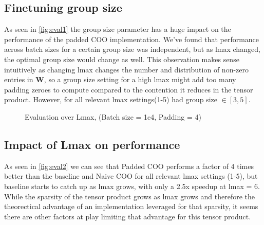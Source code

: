 \subsection{Finetuning group size}
\label{sec:eval:group}
As seen in \autoref{fig:eval1} the group size parameter has a huge impact on the performance of the padded COO implementation. We've found
that performance across batch sizes for a certain group size was independent, but as lmax changed, the optimal group size would change as well.
This observation makes sense intuitively as changing lmax changes the number and distribution of non-zero entries in \textbf{W}, so a group size setting 
for a high lmax might add too many padding zeroes to compute compared to the contention it reduces in the tensor product. However, for all relevant lmax settings(1-5) had group size $\in [3, 5]$.
\begin{figure}
    \centering
{}
\label{fig:eval2}
\caption{Evaluation over Lmax, (Batch size = 1e4, Padding = 4)}
\end{figure}
\subsection{Impact of Lmax on performance}
\label{sec:eval:lmax}
As seen in \autoref{fig:eval2} we can see that Padded COO performs a factor of 4 times better than the baseline and Naive COO for all relevant lmax settings (1-5),
but baseline starts to catch up as lmax grows, with only a 2.5x speedup at lmax = 6. While the sparsity of the tensor product grows as lmax grows and therefore
the theorectical advantage of an implementation leveraged for that sparsity, it seems there are other factors at play limiting that advantage for this 
tensor product.

